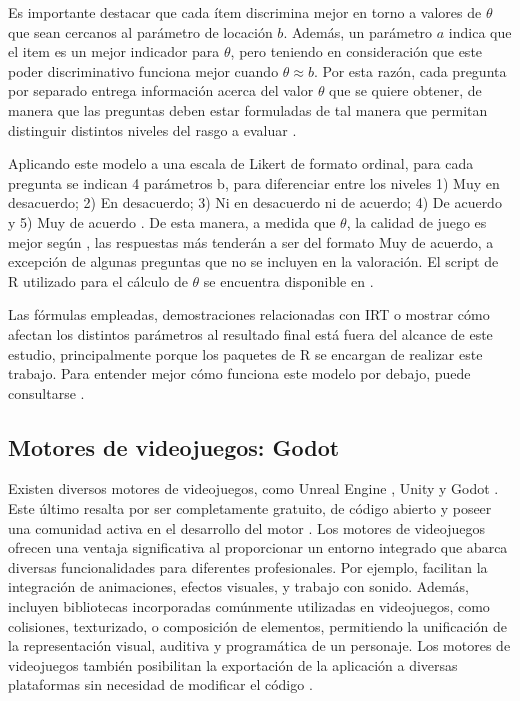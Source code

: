 Es importante destacar que cada ítem discrimina mejor en torno a valores de $\theta$ que sean cercanos al parámetro de locación $b$. Además, un parámetro $a$ indica que el item es un mejor indicador para $\theta$, pero teniendo en consideración que este poder discriminativo funciona mejor cuando $\theta \approx b$. Por esta razón, cada pregunta por separado entrega información acerca del valor $\theta$ que se quiere obtener, de manera que las preguntas deben estar formuladas de tal manera que permitan distinguir distintos niveles del rasgo a evaluar \cite{TeoriaRespuestaAlItemPsicologia}.

Aplicando este modelo a una escala de Likert de formato ordinal, para cada pregunta se indican 4 parámetros b, para diferenciar entre los niveles 1) Muy en desacuerdo; 2) En desacuerdo; 3) Ni en desacuerdo ni de acuerdo; 4) De acuerdo y 5) Muy de acuerdo \cite{TeoriaRespuestaAlItemPsicologia, meegaplusQualityEvaluationPage}. De esta manera, a medida que $\theta$, la calidad de juego es mejor según \cite{meegaplusQualityEvaluationPage}, las respuestas más tenderán a ser del formato Muy de acuerdo, a excepción de algunas preguntas que no se incluyen en la valoración. El script de R utilizado para el cálculo de $\theta$ se encuentra disponible en \cite{meegaplusQualityEvaluationPage}.

Las fórmulas empleadas, demostraciones relacionadas con IRT o mostrar cómo afectan los distintos parámetros al resultado final está fuera del alcance de este estudio, principalmente porque los paquetes de R se encargan de realizar este trabajo. Para entender mejor cómo funciona este modelo por debajo, puede consultarse \cite{IRTShojima2022, CalderonStatisticalIRT}.

\subsection{Motores de videojuegos: Godot}

Existen diversos motores de videojuegos, como Unreal Engine \cite{UE}, Unity \cite{Unity} y Godot \cite{Godot}. Este último resalta por ser completamente gratuito, de código abierto y poseer una comunidad activa en el desarrollo del motor \cite{GodotGithubRepository}. Los motores de videojuegos ofrecen una ventaja significativa al proporcionar un entorno integrado que abarca diversas funcionalidades para diferentes profesionales. Por ejemplo, facilitan la integración de animaciones, efectos visuales, y trabajo con sonido. Además, incluyen bibliotecas incorporadas comúnmente utilizadas en videojuegos, como colisiones, texturizado, o composición de elementos, permitiendo la unificación de la representación visual, auditiva y programática de un personaje. Los motores de videojuegos también posibilitan la exportación de la aplicación a diversas plataformas sin necesidad de modificar el código \cite{GodotExport}.

